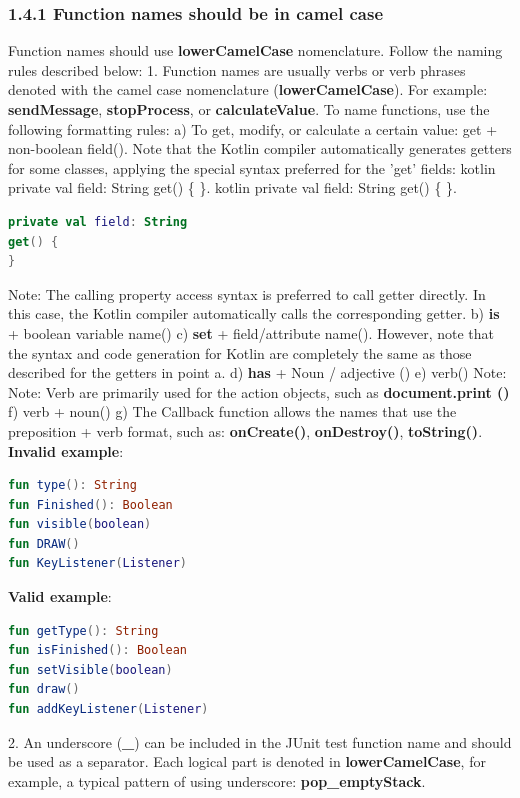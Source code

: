 \subsubsection*{\textbf{1.4.1 Function names should be in camel case}}
\leavevmode\newline
\label{sec:1.4.1}
Function names should use \textbf{lowerCamelCase} nomenclature. Follow the naming rules described below:
1.	Function names are usually verbs or verb phrases denoted with the camel case nomenclature (\textbf{lowerCamelCase}).
For example: \textbf{sendMessage}, \textbf{stopProcess}, or \textbf{calculateValue}.
To name functions, use the following formatting rules:
a) To get, modify, or calculate a certain value: get + non-boolean field(). Note that the Kotlin compiler automatically generates getters for some classes, applying the special syntax preferred for the 'get' fields: kotlin private val field: String get() \{ \}. kotlin private val field: String get() \{ \}.
\begin{lstlisting}[language=Kotlin]
private val field: String
get() {
}
\end{lstlisting}
Note: The calling property access syntax is preferred to call getter directly. In this case, the Kotlin compiler automatically calls the corresponding getter.
b) \textbf{is} + boolean variable name()
c) \textbf{set} + field/attribute name(). However, note that the syntax and code generation for Kotlin are completely the same as those described for the getters in point a.
d) \textbf{has} + Noun / adjective ()
e) verb()
Note: Note: Verb are primarily used for the action objects, such as \textbf{document.print ()}
f) verb + noun()
g) The Callback function allows the names that use the preposition + verb format, such as: \textbf{onCreate()}, \textbf{onDestroy()}, \textbf{toString()}.
\textbf{Invalid example}:
\begin{lstlisting}[language=Kotlin]
fun type(): String
fun Finished(): Boolean
fun visible(boolean)
fun DRAW()
fun KeyListener(Listener)
\end{lstlisting}
\textbf{Valid example}:
\begin{lstlisting}[language=Kotlin]
fun getType(): String
fun isFinished(): Boolean
fun setVisible(boolean)
fun draw()
fun addKeyListener(Listener)
\end{lstlisting}
2.	An underscore (\textbf{\_}) can be included in the JUnit test function name and should be used as a separator. Each logical part is denoted in \textbf{lowerCamelCase}, for example, a typical pattern of using underscore: \textbf{pop\_emptyStack}.
